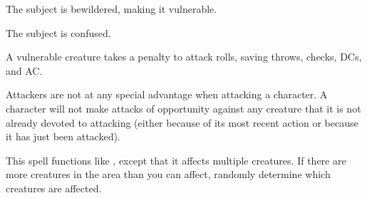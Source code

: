 \spellrng{\rngmed}
\spelldur{\durshort}
\begin{spellhealthy}
  The subject is bewildered, making it vulnerable.
\end{spellhealthy}
\begin{spellblood}
  The subject is confused. \confusionexplanation
\end{spellblood}
\begin{spellnotes}
  A vulnerable creature takes a  penalty to attack rolls, saving throws, checks, DCs, and AC.
  \par Attackers are not at any special advantage when attacking a  character. A  character will not make attacks of opportunity against any creature that it is not already devoted to attacking (either because of its most recent action or because it has just been attacked).
\end{spellnotes}

\begin{spelleffect}
  This spell functions like , except that it affects multiple creatures. If there are more creatures in the area than you can affect, randomly determine which creatures are affected.
\end{spelleffect}

